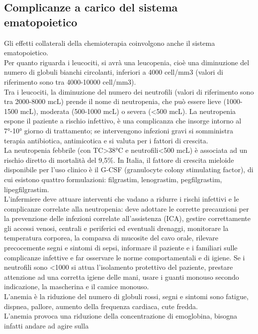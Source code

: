 \subsection{Complicanze a carico del sistema ematopoietico}

Gli effetti collaterali della chemioterapia coinvolgono anche il sistema ematopoietico.\\
Per quanto riguarda i leucociti, si avrà una leucopenia, cioè una diminuzione del numero di globuli bianchi 
circolanti, inferiori a 4000 cell/mm3 (valori di riferimento sono tra 4000-10000 cell/mm3).\\ 
Tra i leucociti, la diminuzione del numero dei neutrofili (valori di riferimento sono tra 2000-8000 mcL) 
prende il nome di neutropenia, che può essere lieve (1000-1500 mcL), moderata (500-1000 mcL) o severa (<500 mcL). 
La neutropenia espone il paziente a rischio infettivo, è una complicanza che insorge intorno al 7°-10° giorno di 
trattamento; se intervengono infezioni gravi si somministra terapia antibiotica, antimicotica e si valuta per i 
fattori di crescita.\\ %
La neutropenia febbrile (con TC>38°C e neutrofili<500 mcL) è associata ad un rischio diretto di mortalità del 9,5\%. 
In Italia, il fattore di crescita mieloide disponibile per l’uso clinico è il G-CSF (granulocyte colony 
stimulating factor), di cui esistono quattro formulazioni: filgrastim, lenograstim, pegfilgrastim, lipegfilgrastim\cite{AIOMTOSS}.\\
L’infermiere deve attuare interventi che vadano a ridurre i rischi infettivi e le complicanze correlate alla 
neutropenia: deve adottare le corrette precauzioni per la prevenzione delle infezioni correlate all’assistenza (ICA), 
gestire correttamente gli accessi venosi, centrali e periferici ed eventuali drenaggi, monitorare la temperatura 
corporea, la comparsa di mucosite del cavo orale, rilevare precocemente segni e sintomi di sepsi, informare il 
paziente e i familiari sulle complicanze infettive e far osservare le norme comportamentali e di igiene. 
Se i neutrofili sono <1000 si attua l’isolamento protettivo del paziente, prestare attenzione ad una corretta 
igiene delle mani, usare i guanti monouso secondo indicazione, la mascherina e il camice monouso.\\ %
L’anemia è la riduzione del numero di globuli rossi, segni e sintomi sono fatigue, dispnea, 
pallore, aumento della frequenza cardiaca, cute fredda\cite{LLSLOWCELLS}.\\
L’anemia provoca una riduzione della concentrazione di emoglobina, bisogna infatti  andare ad agire sulla 
